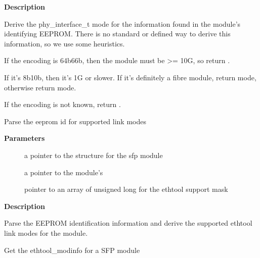 \documentclass[a4paper,8pt,english]{sphinxmanual}
\begin{document}
\textbf{Description}

Derive the phy\_interface\_t mode for the information found in the
module's identifying EEPROM. There is no standard or defined way
to derive this information, so we use some heuristics.

If the encoding is 64b66b, then the module must be \textgreater{}= 10G, so
return .

If it's 8b10b, then it's 1G or slower. If it's definitely a fibre
module, return  mode, otherwise return
 mode.

If the encoding is not known, return .

\begin{fulllineitems}
\label{networking/kapi:c.sfp_parse_support}
Parse the eeprom id for supported link modes

\end{fulllineitems}


\textbf{Parameters}
\begin{description}
\item[{}] \leavevmode
a pointer to the {\hyperref[networking/kapi:c.sfp_bus]{\emph{}}} structure for the sfp module

\item[{}] \leavevmode
a pointer to the module's {\hyperref[networking/kapi:c.sfp_eeprom_id]{\emph{}}}

\item[{}] \leavevmode
pointer to an array of unsigned long for the ethtool support mask

\end{description}

\textbf{Description}

Parse the EEPROM identification information and derive the supported
ethtool link modes for the module.

\begin{fulllineitems}
\label{networking/kapi:c.sfp_get_module_info}
Get the ethtool\_modinfo for a SFP module

\end{fulllineitems}
\end{document}
